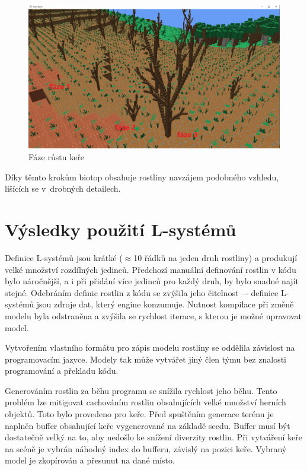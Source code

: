 \documentclass[thesis=M,czech]{FITthesis}[2019/12/23]
\begin{document}
\begin{figure}\centering
	\includegraphics[width=\textwidth]{images/shrub_evolution}
	\caption[Fáze růstu keře]{Fáze růstu keře}\label{fig:shrub_evolution}
\end{figure}

Díky těmto krokům biotop obsahuje rostliny navzájem podobného vzhledu, lišících se v~drobných detailech.

\section{Výsledky použití L-systémů}
Definice L-systémů jsou krátké ($\approx$10 řádků na jeden druh rostliny) a produkují velké množství rozdílných jedinců. Předchozí manuální definování rostlin v kódu bylo náročnější, a i při přidání více jedinců pro každý druh, by bylo snadné najít stejné. Odebráním definic rostlin z kódu se zvýšila jeho čitelnost –- definice L-systémů jsou zdroje dat, který engine konzumuje. Nutnost kompilace při změně modelu byla odstraněna a zvýšila se rychlost iterace, s kterou je možné upravovat model.

Vytvořením vlastního formátu pro zápis modelu rostliny se oddělila závislost na programovacím jazyce. Modely tak může vytvářet jiný člen týmu bez znalosti programování a překladu kódu.

Generováním rostlin za běhu programu se snížila rychlost jeho běhu. Tento problém lze mitigovat cachováním rostlin obsahujících velké množství herních objektů. Toto bylo provedeno pro keře. Před spuštěním generace terénu je naplněn buffer obsahující keře vygenerované na základě seedu. Buffer musí být dostatečně velký na to, aby nedošlo ke snížení diverzity rostlin. Při vytváření keře na scéně je vybrán náhodný index do bufferu, závislý na pozici keře. Vybraný model je zkopírován a přesunut na dané místo.
\end{document}
